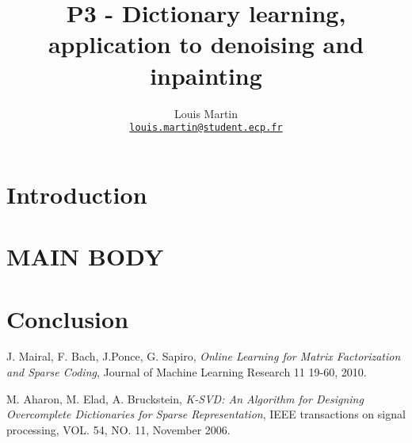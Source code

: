 \documentclass[a4paper,11pt]{article}
\title{P3 - Dictionary learning, application to denoising and inpainting}
\author{
  Louis Martin\\
  \href{mailto:louis.martin@student.ecp.fr}{\tt louis.martin@student.ecp.fr}
}
\begin{document}
\maketitle
\pagebreak

\begin{abstract}

\end{abstract}

\section{Introduction}


\section{MAIN BODY}

\section{Conclusion}




\begin{thebibliography}{9}
  J. Mairal, F. Bach, J.Ponce, G. Sapiro,
  \emph{Online Learning for Matrix Factorization and Sparse Coding},
  Journal of Machine Learning Research 11 19-60, 2010.

  M. Aharon, M. Elad, A. Bruckstein,
  \emph{K-SVD: An Algorithm for Designing Overcomplete Dictionaries for Sparse Representation},
  IEEE transactions on signal processing, VOL. 54, NO. 11, November 2006.
 

\end{thebibliography}
\end{document}
